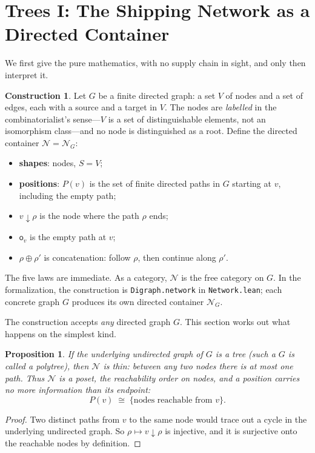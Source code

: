 \documentclass[11pt,a4paper]{article}
\newcommand{\N}{\mathcal{N}}
\newcommand{\dc}{\mathbin{\downarrow}}
\newcommand{\obs}{\mathsf{o}}
\theoremstyle{plain}
\newtheorem{proposition}[theorem]{Proposition}
\theoremstyle{definition}
\newtheorem{construction}[theorem]{Construction}
\theoremstyle{remark}
\begin{document}
\section{Trees I: The Shipping Network as a Directed Container}\label{sec:network}

We first give the pure mathematics, with no supply chain in sight,
and only then interpret it.

\begin{construction}\label{con:network}
Let $G$ be a finite directed graph: a set $V$ of nodes and a set of
edges, each with a source and a target in $V$. The nodes are
\emph{labelled} in the combinatorialist's sense---$V$ is a set of
distinguishable elements, not an isomorphism class---and no node is
distinguished as a root. Define the directed container $\N = \N_G$:
\begin{itemize}[nosep]
\item \textbf{shapes}: nodes, $S = V$;
\item \textbf{positions}: $P(v)$ is the set of finite directed paths
  in $G$ starting at $v$, including the empty path;
\item $v \dc \rho$ is the node where the path $\rho$ ends;
\item $\obs_v$ is the empty path at $v$;
\item $\rho \oplus \rho'$ is concatenation: follow $\rho$, then
  continue along $\rho'$.
\end{itemize}
The five laws are immediate. As a category, $\N$ is the free category
on $G$.  In the formalization, the construction is
\texttt{Digraph.network} in \texttt{Network.lean}; each concrete graph
$G$ produces its own directed container $\N_G$.
\end{construction}

The construction accepts \emph{any} directed graph $G$. This
section works out what happens on the simplest kind.

\begin{proposition}\label{prop:tree}
If the underlying undirected graph of $G$ is a tree (such a $G$ is
called a \emph{polytree}), then $\N$ is \emph{thin}: between any
two nodes there is at most one path. Thus $\N$ is a poset, the
reachability order on nodes, and a position carries no more
information than its endpoint:
\[
P(v) \;\cong\; \{\text{nodes reachable from } v\}.
\]
\end{proposition}

\begin{proof}
Two distinct paths from $v$ to the same node would trace out a
cycle in the underlying undirected graph. So
$\rho \mapsto v \dc \rho$ is injective, and it is surjective onto
the reachable nodes by definition.
\end{proof}
\end{document}

